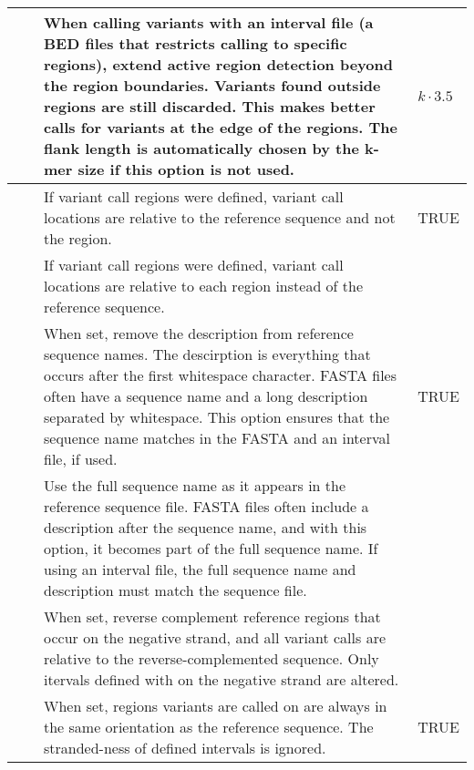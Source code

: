 \begin{small}
\begin{longtable}{|p{\optwidth}|p{\argwidth}|p{\dscwidth}|p{}|}
		\lopt{autoflank} & &
		When calling variants with an interval file (a BED files that restricts calling to specific regions), extend active region detection beyond the region boundaries. Variants found outside regions are still discarded. This makes better calls for variants at the edge of the regions. The flank length is automatically chosen by the k-mer size if this option is not used.
		& $k \cdot 3.5$
		\\ \hline
		
		\lopt{byreference} & &
		If variant call regions were defined, variant call locations are relative to the reference sequence and not the region.
		& TRUE
		\\ \hline
		
		\lopt{byregion} & &
		If variant call regions were defined, variant call locations are relative to each region instead of the reference sequence.
		&
		\\ \hline
		
		\lopt{rmrefdesc} & &
		When set, remove the description from reference sequence names. The descirption is everything that occurs after the first whitespace character. FASTA files often have a sequence name and a long description separated by whitespace. This option ensures that the sequence name matches in the FASTA and an interval file, if used.
		& TRUE
		\\ \hline
		
		\lopt{normrefdesc} & &
		Use the full sequence name as it appears in the reference sequence file. FASTA files often include a description after the sequence name, and with this option, it becomes part of the full sequence name. If using an interval file, the full sequence name and description must match the sequence file.
		&
		\\ \hline
		
		\lopt{revregion} & &
		When set, reverse complement reference regions that occur on the negative strand, and all variant calls are relative to the reverse-complemented sequence. Only itervals defined with on the negative strand are altered.
		&
		\\ \hline
		
		\lopt{norevregion} & &
		When set, regions variants are called on are always in the same orientation as the reference sequence. The stranded-ness of defined intervals is ignored.
		& TRUE
		\\ \hline
		
	\end{longtable}
\end{small}

